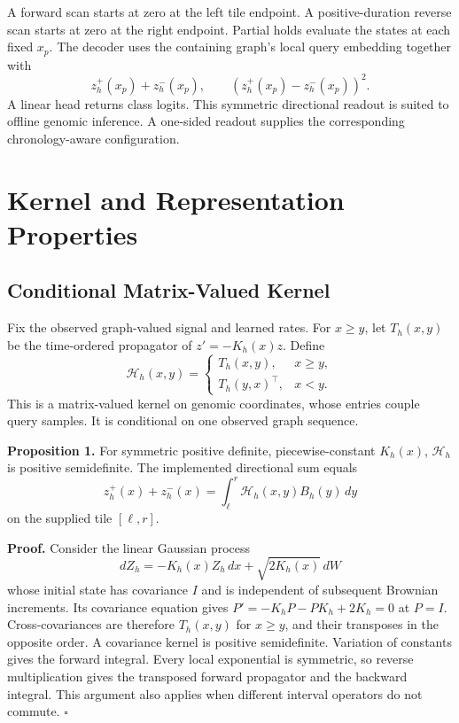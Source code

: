 \documentclass[letterpaper]{article}
\begin{document}
A forward scan starts at zero at the left tile endpoint. A positive-duration reverse scan starts at zero at the right endpoint. Partial holds evaluate the states at each fixed $x_p$. The decoder uses the containing graph's local query embedding together with
\begin{equation}
 z_h^+(x_p)+z_h^-(x_p),\qquad
 (z_h^+(x_p)-z_h^-(x_p))^2.
\end{equation}
A linear head returns class logits. This symmetric directional readout is suited to offline genomic inference. A one-sided readout supplies the corresponding chronology-aware configuration.

\section{Kernel and Representation Properties}
\subsection{Conditional Matrix-Valued Kernel}
Fix the observed graph-valued signal and learned rates. For $x\geq y$, let $T_h(x,y)$ be the time-ordered propagator of $z'=-K_h(x)z$. Define
\begin{equation}
 \mathcal H_h(x,y)=
 \begin{cases}
 T_h(x,y),&x\geq y,\\
 T_h(y,x)^\top,&x<y.
 \end{cases}
\end{equation}
This is a matrix-valued kernel on genomic coordinates, whose entries couple query samples. It is conditional on one observed graph sequence.

\textbf{Proposition 1.}
For symmetric positive definite, piecewise-constant $K_h(x)$, $\mathcal H_h$ is positive semidefinite. The implemented directional sum equals
\begin{equation}
 z_h^+(x)+z_h^-(x)=
 \int_{\ell}^{r}\mathcal H_h(x,y)B_h(y)\,dy
\end{equation}
on the supplied tile $[\ell,r]$.

\textbf{Proof.}
Consider the linear Gaussian process
\begin{equation}
 dZ_h=-K_h(x)Z_h\,dx+\sqrt{2K_h(x)}\,dW
\end{equation}
whose initial state has covariance $I$ and is independent of subsequent Brownian increments. Its covariance equation gives
$P'=-K_hP-PK_h+2K_h=0$ at $P=I$.
Cross-covariances are therefore $T_h(x,y)$ for $x\geq y$, and their transposes in the opposite order. A covariance kernel is positive semidefinite. Variation of constants gives the forward integral. Every local exponential is symmetric, so reverse multiplication gives the transposed forward propagator and the backward integral. This argument also applies when different interval operators do not commute. $\square$
\end{document}
